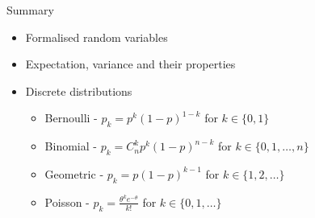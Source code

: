 \documentclass{beamer}
\begin{document}
\begin{frame}{Summary}  
\begin{itemize} 
 \item Formalised random variables 
\item Expectation, variance and their properties 
\item Discrete distributions 
\begin{itemize} 
\item Bernoulli - $p_k= p^k (1-p)^{1-k}$ for $k \in \{0, 1\}$
\item Binomial - $p_k= C^k_n p^k (1-p)^{n-k}$ for $k \in \{0, 1, \ldots, n\}$
\item Geometric - $p_k = p (1-p)^{k-1} $ for $k \in \{1, 2, \ldots\}$
\item Poisson - $p_k =  \frac{\theta^k e^{-\theta}}{k!}$ for $k \in \{0, 1, \ldots\}$
\end{itemize}
\end{itemize} 
\end{frame}
\end{document}
